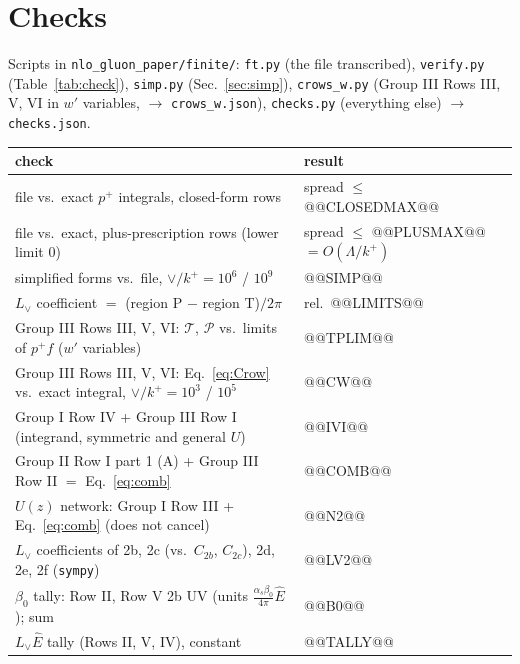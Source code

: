 \documentclass[10pt]{article}
\numberwithin{equation}{section}
\newcommand{\Lv}{L_{\vee}}
\newcommand{\Eh}{\hat E}
\begin{document}
\section{Checks}\label{sec:checks}
Scripts in \texttt{nlo\_gluon\_paper/finite/}: \texttt{ft.py} (the file transcribed), \texttt{verify.py} (Table~\ref{tab:check}), \texttt{simp.py} (Sec.~\ref{sec:simp}), \texttt{crows\_w.py} (Group III Rows III, V, VI in $w'$ variables, $\to$ \texttt{crows\_w.json}), \texttt{checks.py} (everything else) $\to$ \texttt{checks.json}.
\begin{table}[H]\centering\small
\begin{tabular}{@{}p{}p{}@{}}\toprule
check & result\\\midrule
file vs.\ exact $p^+$ integrals, closed-form rows & spread $\le$ @@CLOSEDMAX@@\\
file vs.\ exact, plus-prescription rows (lower limit $0$) & spread $\le$ @@PLUSMAX@@ $=O(\Lambda/k^+)$\\
simplified forms vs.\ file, $\vee/k^+=10^6$ / $10^9$ & @@SIMP@@\\
$\Lv$ coefficient $=$ (region P $-$ region T)$/2\pi$ & rel.\ @@LIMITS@@\\
Group III Rows III, V, VI: $\mathcal T$, $\mathcal P$ vs.\ limits of $p^+f$ ($w'$ variables) & @@TPLIM@@\\
Group III Rows III, V, VI: Eq.~\eqref{eq:Crow} vs.\ exact integral, $\vee/k^+=10^3$ / $10^5$ & @@CW@@\\
Group I Row IV + Group III Row I (integrand, symmetric and general $U$) & @@IVI@@\\
Group II Row I part 1 (A) + Group III Row II $=$ Eq.~\eqref{eq:comb} & @@COMB@@\\
$U(z)$ network: Group I Row III + Eq.~\eqref{eq:comb} (does not cancel) & @@N2@@\\
$\Lv$ coefficients of 2b, 2c (vs.\ $C_{2b}$, $C_{2c}$), 2d, 2e, 2f (\texttt{sympy}) & @@LV2@@\\
$\beta_0$ tally: Row II, Row V 2b UV (units $\frac{\alpha_s\beta_0}{4\pi}\Eh$); sum & @@B0@@\\
$\Lv\Eh$ tally (Rows II, V, IV), constant & @@TALLY@@\\\bottomrule
\end{tabular}
\end{table}
\end{document}
